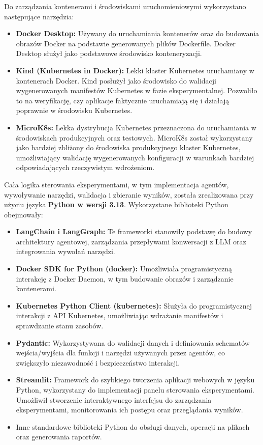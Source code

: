 Do zarządzania kontenerami i środowiskami uruchomieniowymi wykorzystano następujące narzędzia:
\begin{itemize}
	\item \textbf{Docker Desktop:} \cite{docker_desktop} Używany do uruchamiania kontenerów oraz do budowania obrazów Docker na podstawie generowanych plików Dockerfile. Docker Desktop służył jako podstawowe środowisko konteneryzacji.
	\item \textbf{Kind (Kubernetes in Docker):} \cite{kind} Lekki klaster Kubernetes uruchamiany w kontenerach Docker. Kind posłużył jako środowisko do walidacji wygenerowanych manifestów Kubernetes w fazie eksperymentalnej. Pozwoliło to na weryfikację, czy aplikacje faktycznie uruchamiają się i działają poprawnie w środowisku Kubernetes.
	\item \textbf{MicroK8s:} \cite{microk8s} Lekka dystrybucja Kubernetes przeznaczona do uruchamiania w środowiskach produkcyjnych oraz testowych. MicroK8s został wykorzystany jako bardziej zbliżony do środowiska produkcyjnego klaster Kubernetes, umożliwiający walidację wygenerowanych konfiguracji w warunkach bardziej odpowiadających rzeczywistym wdrożeniom.
\end{itemize}

Cała logika sterowania eksperymentami, w tym implementacja agentów, wywoływanie narzędzi, walidacja i zbieranie wyników, została zrealizowana przy użyciu języka \textbf{Python w wersji 3.13}. Wykorzystane biblioteki Python obejmowały:
\begin{itemize}
	\item \textbf{LangChain i LangGraph:} \cite{langchain} \cite{langgraph} Te frameworki stanowiły podstawę do budowy architektury agentowej, zarządzania przepływami konwersacji z LLM oraz integrowania wywołań narzędzi.
	\item \textbf{Docker SDK for Python (docker):} \cite{docker_sdk_python} Umożliwiała programistyczną interakcję z Docker Daemon, w tym budowanie obrazów i zarządzanie kontenerami.
	\item \textbf{Kubernetes Python Client (kubernetes):} \cite{kubernetes_sdk_python} Służyła do programistycznej interakcji z API Kubernetes, umożliwiając wdrażanie manifestów i sprawdzanie stanu zasobów.
	\item \textbf{Pydantic:} \cite{pydantic} Wykorzystywana do walidacji danych i definiowania schematów wejścia/wyjścia dla funkcji i narzędzi używanych przez agentów, co zwiększyło niezawodność i bezpieczeństwo interakcji.
	\item \textbf{Streamlit:} \cite{streamlit} Framework do szybkiego tworzenia aplikacji webowych w języku Python, wykorzystany do implementacji panelu sterowania eksperymentami. Umożliwił stworzenie interaktywnego interfejsu do zarządzania eksperymentami, monitorowania ich postępu oraz przeglądania wyników.
	\item Inne standardowe biblioteki Python do obsługi danych, operacji na plikach oraz generowania raportów.
\end{itemize}

